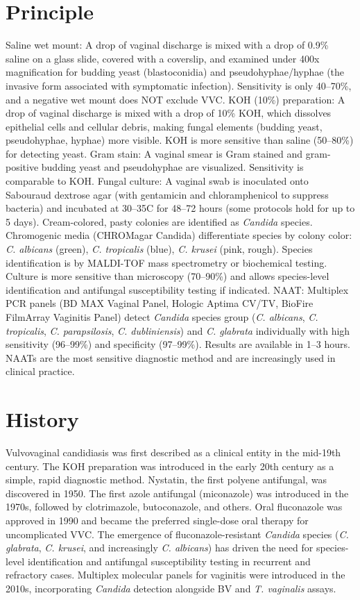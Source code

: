 \section*{Principle}
Saline wet mount: A drop of vaginal discharge is mixed with a drop of 0.9\% saline on a glass slide, covered with a coverslip, and examined under 400x magnification for budding yeast (blastoconidia) and pseudohyphae/hyphae (the invasive form associated with symptomatic infection). Sensitivity is only 40--70\%, and a negative wet mount does NOT exclude VVC. KOH (10\%) preparation: A drop of vaginal discharge is mixed with a drop of 10\% KOH, which dissolves epithelial cells and cellular debris, making fungal elements (budding yeast, pseudohyphae, hyphae) more visible. KOH is more sensitive than saline (50--80\%) for detecting yeast. Gram stain: A vaginal smear is Gram stained and gram-positive budding yeast and pseudohyphae are visualized. Sensitivity is comparable to KOH. Fungal culture: A vaginal swab is inoculated onto Sabouraud dextrose agar (with gentamicin and chloramphenicol to suppress bacteria) and incubated at 30--35\textdegree{}C for 48--72 hours (some protocols hold for up to 5 days). Cream-colored, pasty colonies are identified as \textit{Candida} species. Chromogenic media (CHROMagar Candida) differentiate species by colony color: \textit{C. albicans} (green), \textit{C. tropicalis} (blue), \textit{C. krusei} (pink, rough). Species identification is by MALDI-TOF mass spectrometry or biochemical testing. Culture is more sensitive than microscopy (70--90\%) and allows species-level identification and antifungal susceptibility testing if indicated. NAAT: Multiplex PCR panels (BD MAX Vaginal Panel, Hologic Aptima CV/TV, BioFire FilmArray Vaginitis Panel) detect \textit{Candida} species group (\textit{C. albicans}, \textit{C. tropicalis}, \textit{C. parapsilosis}, \textit{C. dubliniensis}) and \textit{C. glabrata} individually with high sensitivity (96--99\%) and specificity (97--99\%). Results are available in 1--3 hours. NAATs are the most sensitive diagnostic method and are increasingly used in clinical practice.

\section*{History}
Vulvovaginal candidiasis was first described as a clinical entity in the mid-19th century. The KOH preparation was introduced in the early 20th century as a simple, rapid diagnostic method. Nystatin, the first polyene antifungal, was discovered in 1950. The first azole antifungal (miconazole) was introduced in the 1970s, followed by clotrimazole, butoconazole, and others. Oral fluconazole was approved in 1990 and became the preferred single-dose oral therapy for uncomplicated VVC. The emergence of fluconazole-resistant \textit{Candida} species (\textit{C. glabrata}, \textit{C. krusei}, and increasingly \textit{C. albicans}) has driven the need for species-level identification and antifungal susceptibility testing in recurrent and refractory cases. Multiplex molecular panels for vaginitis were introduced in the 2010s, incorporating \textit{Candida} detection alongside BV and \textit{T. vaginalis} assays.

